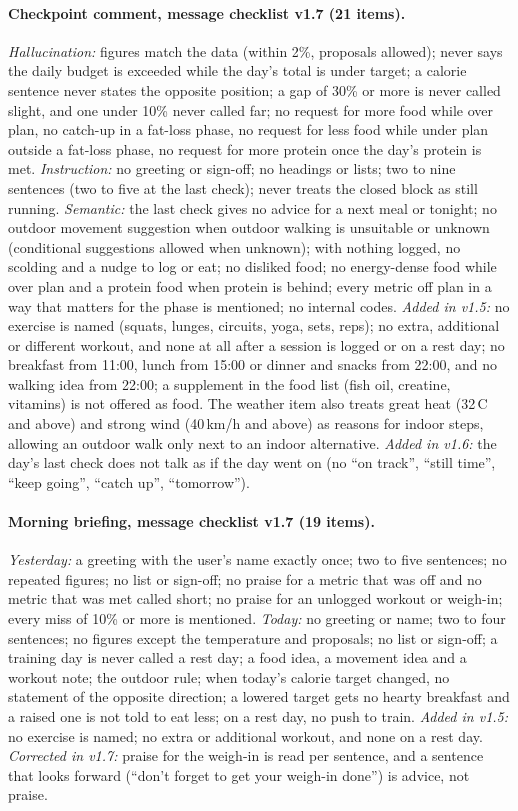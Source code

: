 \documentclass[10pt,twocolumn]{article}
\begin{document}
\paragraph{Checkpoint comment, message checklist v1.7 (21 items).}
\emph{Hallucination:} figures match the data (within 2\%, proposals allowed); never says the daily budget is exceeded
while the day's total is under target; a calorie sentence never states the opposite position; a gap of 30\% or more
is never called slight, and one under 10\% never called far; no request for more food while over plan, no catch-up
in a fat-loss phase, no request for less food while under plan outside a fat-loss phase, no request for more protein
once the day's protein is met.
\emph{Instruction:} no greeting or sign-off; no headings or lists; two to nine sentences (two to five at the last
check); never treats the closed block as still running.
\emph{Semantic:} the last check gives no advice for a next meal or tonight; no outdoor movement suggestion when
outdoor walking is unsuitable or unknown (conditional suggestions allowed when unknown); with nothing logged, no
scolding and a nudge to log or eat; no disliked food; no energy-dense food while over plan and a protein food when
protein is behind; every metric off plan in a way that matters for the phase is mentioned; no internal codes.
\emph{Added in v1.5:} no exercise is named (squats, lunges, circuits, yoga, sets, reps); no extra, additional or
different workout, and none at all after a session is logged or on a rest day; no breakfast from 11:00, lunch from
15:00 or dinner and snacks from 22:00, and no walking idea from 22:00; a supplement in the food list (fish oil,
creatine, vitamins) is not offered as food. The weather item also treats great heat (32\,\textdegree{}C and above) and
strong wind (40\,km/h and above) as reasons for indoor steps, allowing an outdoor walk only next to an indoor
alternative. \emph{Added in v1.6:} the day's last check does not talk as if the day went on (no ``on track'', ``still
time'', ``keep going'', ``catch up'', ``tomorrow'').

\paragraph{Morning briefing, message checklist v1.7 (19 items).}
\emph{Yesterday:} a greeting with the user's name exactly once; two to five sentences; no repeated figures; no list or
sign-off; no praise for a metric that was off and no metric that was met called short; no praise for an unlogged
workout or weigh-in; every miss of 10\% or more is mentioned.
\emph{Today:} no greeting or name; two to four sentences; no figures except the temperature and proposals; no list
or sign-off; a training day is never called a rest day; a food idea, a movement idea and a workout note; the outdoor
rule; when today's calorie target changed, no statement of the opposite direction; a lowered target gets no hearty
breakfast and a raised one is not told to eat less; on a rest day, no push to train. \emph{Added in v1.5:} no exercise
is named; no extra or additional workout, and none on a rest day. \emph{Corrected in v1.7:} praise for the weigh-in is read
per sentence, and a sentence that looks forward (``don't forget to get your weigh-in done'') is advice, not praise.
\end{document}
